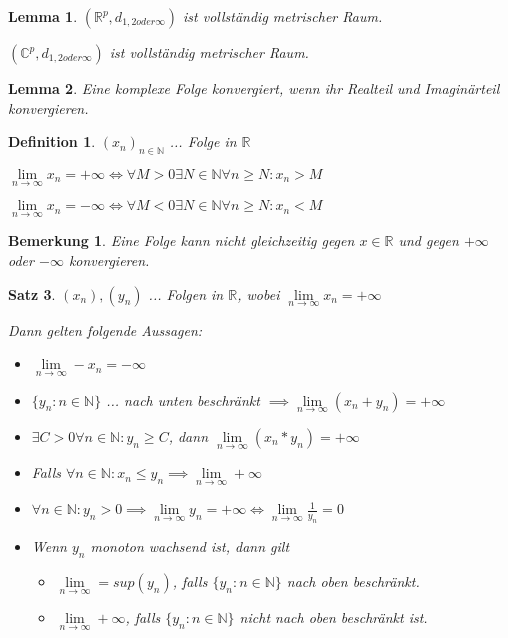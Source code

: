 \documentclass[twocolumn]{article}
\newtheorem{theorem}{Satz}[section]
\newtheorem{lemma}[theorem]{Lemma}
\newtheorem{definition}{Definition}[section]
\newtheorem*{remark}{Bemerkung}
\newcommand*{\logeq}{\Leftrightarrow}
\begin{document}
\begin{lemma}
	$(\mathbb{R}^p,d_{1, 2 oder \infty})$ ist vollständig metrischer Raum.
	
	$(\mathbb{C}^p,d_{1, 2 oder \infty})$ ist vollständig metrischer Raum.
\end{lemma}

\begin{lemma}
	Eine komplexe Folge konvergiert, wenn ihr Realteil und Imaginärteil konvergieren.
\end{lemma}

\begin{definition}
	$(x_n)_{n \in \mathbb{N}}$ ... Folge in $\mathbb{R}$
	
	$\lim\limits_{n \rightarrow \infty}x_n = +\infty \logeq \forall M > 0 \exists N \in \mathbb{N} \forall n \geq N : x_n > M$
	
	$\lim\limits_{n \rightarrow \infty}x_n = -\infty \logeq \forall M < 0 \exists N \in \mathbb{N} \forall n \geq N : x_n < M$
\end{definition}

\begin{remark}
	Eine Folge kann nicht gleichzeitig gegen $x \in \mathbb{R}$ und gegen $+\infty$ oder $-\infty$ konvergieren.
\end{remark}

\begin{theorem}
	$(x_n), (y_n)$ ... Folgen in $\mathbb{R}$, wobei $\lim\limits_{n \rightarrow \infty}x_n = +\infty$
	
	Dann gelten folgende Aussagen:
	
	\begin{itemize}
		\item $\lim\limits_{n \rightarrow \infty}-x_n = -\infty$
		\item $\{y_n:n\in \mathbb{N}\}$ ... nach unten beschränkt $\implies \lim\limits_{n \rightarrow \infty}(x_n+y_n)=+\infty$
		\item $\exists C >0 \forall n \in \mathbb{N} : y_n \geq C$, dann $\lim\limits_{n\rightarrow\infty}(x_n*y_n)=+\infty$
		\item Falls $\forall n \in \mathbb{N} : x_n \leq y_n \implies \lim\limits_{n \rightarrow \infty}+\infty$
		\item $\forall n \in \mathbb{N} : y_n > 0 \implies \lim\limits_{n \rightarrow \infty}y_n = +\infty \logeq \lim\limits_{n \rightarrow \infty} \frac{1}{y_n}=0$
		\item Wenn $y_n$ monoton wachsend ist, dann gilt 
		\begin{itemize}
			\item $\lim\limits_{n\rightarrow \infty}=sup(y_n)$, falls $\{y_n : n \in \mathbb{N}\}$ nach oben beschränkt.
			\item $\lim\limits_{n\rightarrow\infty}+\infty$, falls $\{y_n : n \in \mathbb{N}\}$ nicht nach oben beschränkt ist.
		\end{itemize}
	\end{itemize}
\end{theorem}
\end{document}
